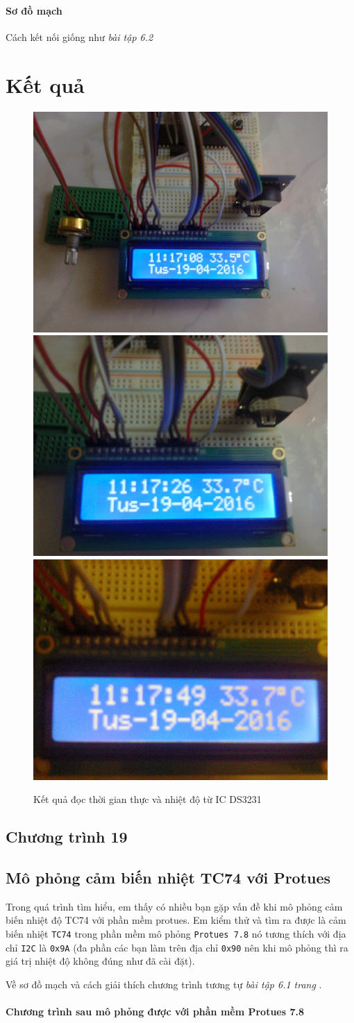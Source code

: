 \paragraph{Sơ đồ mạch}Cách kết nối giống như \textit{bài tập 6.2}
\section*{Kết quả}
\begin{figure}[!h]
\begin{center}
  {\includegraphics[width=.3\linewidth]{bai-6/image/6-3-1}}
  {\includegraphics[width=.3\linewidth]{bai-6/image/6-3-2}}
  {\includegraphics[width=.3\linewidth]{bai-6/image/6-3-3}}
\end{center}
\caption{Kết quả đọc thời gian thực  và nhiệt độ từ IC DS3231}
\end{figure}
\subsection*{Chương trình 19}
\label{code-19}

\subsection{Mô phỏng cảm biến nhiệt TC74 với Protues}\label{def:TC74}
Trong quá trình tìm hiểu, em thấy có nhiều bạn gặp vấn đề khi mô phỏng cảm biến nhiệt độ TC74 với phần mềm protues. Em kiểm thử và tìm ra được là cảm biến nhiệt \verb|TC74| trong phần mềm mô phỏng \verb|Protues 7.8| nó tương thích với địa chỉ \verb|I2C| là \verb|0x9A| (đa phần các bạn làm trên địa chỉ \verb|0x90| nên khi mô phỏng thì ra giá trị nhiệt độ không đúng như đã cài đặt).

Về sơ đồ mạch và cách giải thích chương trình tương tự \textit{bài tập 6.1 trang \pageref{Ex:6-1}}.
\newpage
\paragraph{Chương trình sau mô phỏng được với phần mềm Protues 7.8}{~\\}

